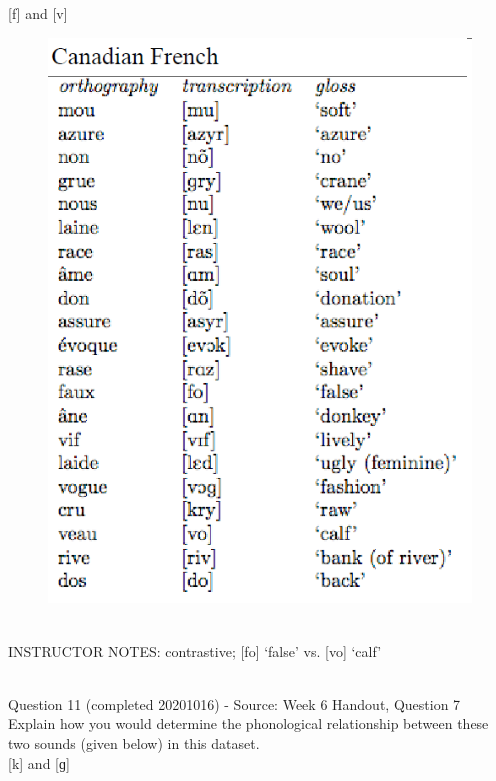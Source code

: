 \documentclass[12pt]{article}
\begin{document}
{[f]} and {[v]}

\begin{figure}[H]
\includegraphics{../images/canadianfrench.png}
\end{figure}

~\\
INSTRUCTOR NOTES: contrastive; [fo] ‘false’ vs. [vo] ‘calf’


~\\

{\large Question 11} (completed 20201016) - Source: Week 6 Handout, Question 7\\

Explain how you would determine the phonological relationship between these two sounds (given below) in this dataset.\\

{[k]} and {[ɡ]}
\end{document}
